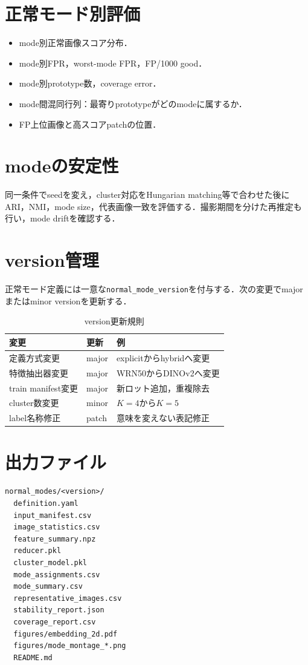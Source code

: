 \documentclass[a4paper,11pt]{ltjsarticle}
\begin{document}
\section{正常モード別評価}
\begin{itemize}
  \item mode別正常画像スコア分布．
  \item mode別FPR，worst-mode FPR，FP/1000 good．
  \item mode別prototype数，coverage error．
  \item mode間混同行列：最寄りprototypeがどのmodeに属するか．
  \item FP上位画像と高スコアpatchの位置．
\end{itemize}

\section{modeの安定性}
同一条件でseedを変え，cluster対応をHungarian matching等で合わせた後にARI，NMI，mode size，代表画像一致を評価する．撮影期間を分けた再推定も行い，mode driftを確認する．

\section{version管理}
正常モード定義には一意な\texttt{normal\_mode\_version}を付与する．次の変更でmajorまたはminor versionを更新する．
\begin{table}[H]
\centering
\caption{version更新規則}
\begin{tabularx}{\linewidth}{L{33mm}L{31mm}Y}
\toprule
変更 & 更新 & 例 \\
\midrule
定義方式変更 & major & explicitからhybridへ変更 \\
特徴抽出器変更 & major & WRN50からDINOv2へ変更 \\
train manifest変更 & major & 新ロット追加，重複除去 \\
cluster数変更 & minor & $K=4$から$K=5$ \\
label名称修正 & patch & 意味を変えない表記修正 \\
\bottomrule
\end{tabularx}
\end{table}

\section{出力ファイル}
\begin{lstlisting}
normal_modes/<version>/
  definition.yaml
  input_manifest.csv
  image_statistics.csv
  feature_summary.npz
  reducer.pkl
  cluster_model.pkl
  mode_assignments.csv
  mode_summary.csv
  representative_images.csv
  stability_report.json
  coverage_report.csv
  figures/embedding_2d.pdf
  figures/mode_montage_*.png
  README.md
\end{lstlisting}
\end{document}
